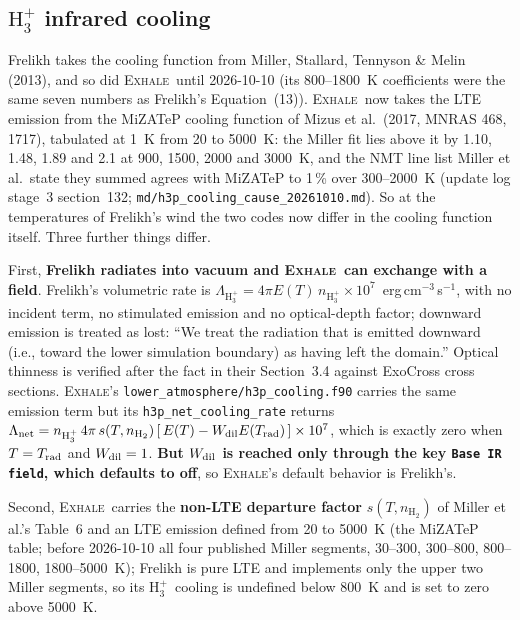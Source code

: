 \documentclass[english,a4paper]{my_memo}
\newcommand{\EXHALE}{\textsc{Exhale}}
\newcommand{\Hth}{\ensuremath{\mathrm{H}_3^+}}
\newcommand{\Htwo}{\ensuremath{\mathrm{H}_2}}
\begin{document}
\subsection{\texorpdfstring{\Hth}{H3+} infrared cooling}
\label{sec:h3p}

Frelikh takes the cooling function from Miller, Stallard, Tennyson \& Melin
(2013), and so did \EXHALE\ until 2026-10-10 (its 800--1800~K coefficients
were the same seven numbers as Frelikh's Equation~(13)). \EXHALE\ now takes
the LTE emission from the MiZATeP cooling function of Mizus et al.\ (2017,
MNRAS 468, 1717), tabulated at 1~K from 20 to 5000~K: the Miller fit lies
above it by 1.10, 1.48, 1.89 and 2.1 at 900, 1500, 2000 and 3000~K, and the
NMT line list Miller et al.\ state they summed agrees with MiZATeP to 1\,\%
over 300--2000~K (update log stage~3 section~132;
\texttt{md/h3p\_cooling\_cause\_20261010.md}). So at the temperatures of
Frelikh's wind the two codes now differ in the cooling function itself. Three
further things differ.

First, \textbf{Frelikh radiates into vacuum and \EXHALE\ can exchange with a
field}. Frelikh's volumetric rate is
$\Lambda_{\Hth} = 4\pi E(T)\,n_{\Hth}\times10^{7}$~erg\,cm$^{-3}$\,s$^{-1}$,
with no incident term, no stimulated emission and no optical-depth factor;
downward emission is treated as lost: ``We treat the radiation that is emitted
downward (i.e., toward the lower simulation boundary) as having left the
domain.'' Optical thinness is verified after the fact in their Section~3.4
against ExoCross cross sections. \EXHALE's
\texttt{lower\_atmosphere/h3p\_cooling.f90} carries the same emission term but
its \texttt{h3p\_net\_cooling\_rate} returns
$\Lambda_{\rm net} = n_{\Hth}\,4\pi\,s(T,n_{\Htwo})\,[\,E(T) - W_{\rm
dil}E(T_{\rm rad})\,]\times10^{7}$, which is exactly zero when $T = T_{\rm
rad}$ and $W_{\rm dil} = 1$. \textbf{But $W_{\rm dil}$ is reached only through
the key \texttt{Base IR field}, which defaults to off}, so \EXHALE's default
behavior is Frelikh's.

Second, \EXHALE\ carries the \textbf{non-LTE departure factor}
$s(T, n_{\Htwo})$ of Miller et al.'s Table~6 and an LTE emission defined
from 20 to 5000~K (the MiZATeP table; before 2026-10-10 all four published
Miller segments, 30--300, 300--800, 800--1800, 1800--5000~K); Frelikh is pure
LTE and implements only the upper two Miller segments, so its \Hth\ cooling is undefined
below 800~K and is set to zero above 5000~K.
\end{document}
